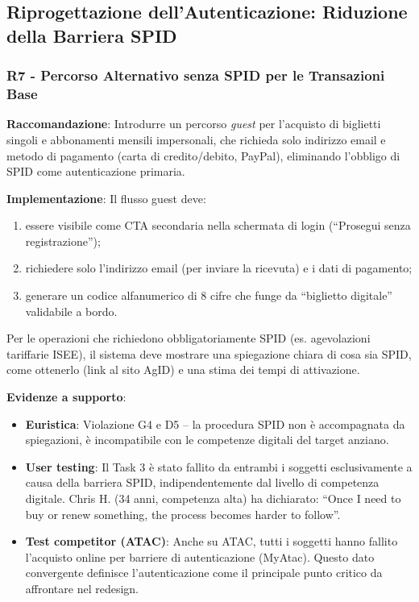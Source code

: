 \documentclass[11pt,a4paper]{article}
\begin{document}

\subsection{Riprogettazione dell'Autenticazione: Riduzione della Barriera SPID}

\subsubsection{R7 - Percorso Alternativo senza SPID per le Transazioni Base}
\label{rec:R7}

\textbf{Raccomandazione}: Introdurre un percorso \textit{guest} per l'acquisto
di biglietti singoli e abbonamenti mensili impersonali, che richieda solo
indirizzo email e metodo di pagamento (carta di credito/debito, PayPal),
eliminando l'obbligo di SPID come autenticazione primaria.

\textbf{Implementazione}: Il flusso guest deve:
\begin{enumerate}
    \item essere visibile come CTA secondaria nella schermata di login
    (“Prosegui senza registrazione”);
    \item richiedere solo l'indirizzo email (per inviare la ricevuta) e i
    dati di pagamento;
    \item generare un codice alfanumerico di 8 cifre che funge da
    “biglietto digitale” validabile a bordo.
\end{enumerate}
Per le operazioni che richiedono obbligatoriamente SPID (es. agevolazioni
tariffarie ISEE), il sistema deve mostrare una spiegazione chiara di cosa
sia SPID, come ottenerlo (link al sito AgID) e una stima dei tempi di
attivazione.

\textbf{Evidenze a supporto}:
\begin{itemize}
    \item \textbf{Euristica}: Violazione G4 e D5 -- la procedura SPID non \`e
    accompagnata da spiegazioni, \`e incompatibile con le competenze digitali
    del target anziano.
    \item \textbf{User testing}: Il Task 3 \`e stato fallito da entrambi i
    soggetti esclusivamente a causa della barriera SPID, indipendentemente dal
    livello di competenza digitale. Chris H. (34 anni, competenza
    alta) ha dichiarato: “Once I need to buy or renew something, the process
    becomes harder to follow”.
    \item \textbf{Test competitor (ATAC)}: Anche su ATAC, tutti i soggetti
    hanno fallito l'acquisto online per barriere di autenticazione
    (MyAtac). Questo dato convergente definisce l'autenticazione
    come il principale punto critico da affrontare nel redesign.
\end{itemize}
\end{document}
